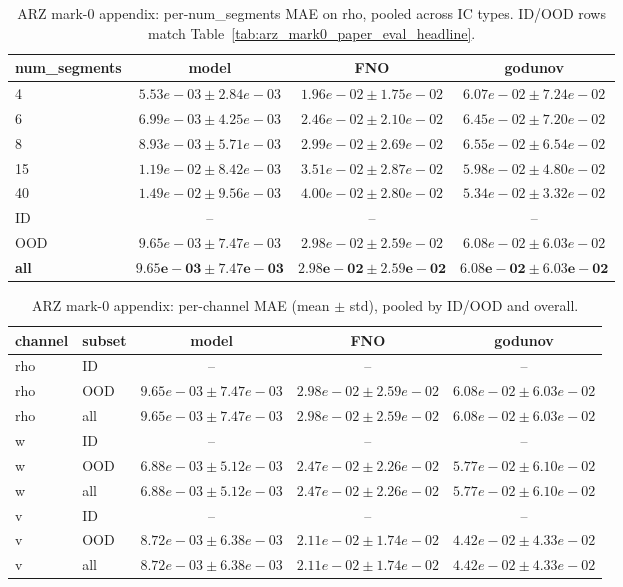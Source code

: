 \begin{table}[h]
\centering
\caption{ARZ mark-0 appendix: per-num\_segments MAE on rho, pooled across IC types. ID/OOD rows match Table~\ref{tab:arz_mark0_paper_eval_headline}.}
\label{tab:arz_mark0_paper_eval_appendix_seg}
\begin{tabular}{lccc}
\hline
num\_segments & model & FNO & godunov \\
\hline
4 & $5.53e-03 \pm 2.84e-03$ & $1.96e-02 \pm 1.75e-02$ & $6.07e-02 \pm 7.24e-02$ \\
6 & $6.99e-03 \pm 4.25e-03$ & $2.46e-02 \pm 2.10e-02$ & $6.45e-02 \pm 7.20e-02$ \\
8 & $8.93e-03 \pm 5.71e-03$ & $2.99e-02 \pm 2.69e-02$ & $6.55e-02 \pm 6.54e-02$ \\
15 & $1.19e-02 \pm 8.42e-03$ & $3.51e-02 \pm 2.87e-02$ & $5.98e-02 \pm 4.80e-02$ \\
40 & $1.49e-02 \pm 9.56e-03$ & $4.00e-02 \pm 2.80e-02$ & $5.34e-02 \pm 3.32e-02$ \\
\hline
ID & -- & -- & -- \\
OOD & $9.65e-03 \pm 7.47e-03$ & $2.98e-02 \pm 2.59e-02$ & $6.08e-02 \pm 6.03e-02$ \\
\textbf{all} & $\mathbf{9.65e-03 \pm 7.47e-03}$ & $\mathbf{2.98e-02 \pm 2.59e-02}$ & $\mathbf{6.08e-02 \pm 6.03e-02}$ \\
\hline
\end{tabular}
\end{table}

\begin{table}[h]
\centering
\caption{ARZ mark-0 appendix: per-channel MAE (mean $\pm$ std), pooled by ID/OOD and overall.}
\label{tab:arz_mark0_paper_eval_appendix_channels}
\begin{tabular}{llccc}
\hline
channel & subset & model & FNO & godunov \\
\hline
rho & ID & -- & -- & -- \\
rho & OOD & $9.65e-03 \pm 7.47e-03$ & $2.98e-02 \pm 2.59e-02$ & $6.08e-02 \pm 6.03e-02$ \\
rho & all & $9.65e-03 \pm 7.47e-03$ & $2.98e-02 \pm 2.59e-02$ & $6.08e-02 \pm 6.03e-02$ \\
\hline
w & ID & -- & -- & -- \\
w & OOD & $6.88e-03 \pm 5.12e-03$ & $2.47e-02 \pm 2.26e-02$ & $5.77e-02 \pm 6.10e-02$ \\
w & all & $6.88e-03 \pm 5.12e-03$ & $2.47e-02 \pm 2.26e-02$ & $5.77e-02 \pm 6.10e-02$ \\
\hline
v & ID & -- & -- & -- \\
v & OOD & $8.72e-03 \pm 6.38e-03$ & $2.11e-02 \pm 1.74e-02$ & $4.42e-02 \pm 4.33e-02$ \\
v & all & $8.72e-03 \pm 6.38e-03$ & $2.11e-02 \pm 1.74e-02$ & $4.42e-02 \pm 4.33e-02$ \\
\hline
\end{tabular}
\end{table}
